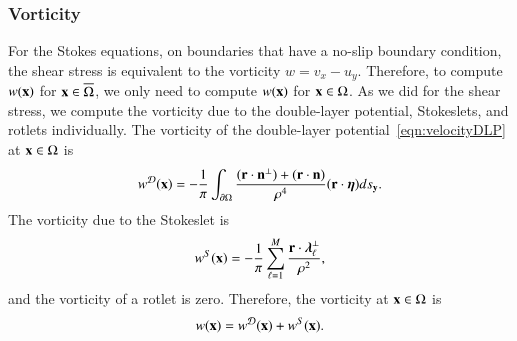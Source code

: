 \documentclass[preprint, 10pt]{elsarticle}
\begin{document}
\subsubsection{Vorticity}
For the Stokes equations, on boundaries that have a no-slip boundary
condition, the shear stress is equivalent to the vorticity $w = v_x -
u_y$.  Therefore, to compute $w({\mathbf{x}})$ for ${\mathbf{x}} \in \overline{\Omega}$,
we only need to compute $w({\mathbf{x}})$ for ${\mathbf{x}} \in \Omega$.  As we did for
the shear stress, we compute the vorticity due to the double-layer
potential, Stokeslets, and rotlets individually.  The vorticity of the
double-layer potential~\eqref{eqn:velocityDLP} at ${\mathbf{x}} \in \Omega$ is
\begin{align}
  w^{{\mathcal{D}}}({\mathbf{x}}) = -\frac{1}{\pi}\int_{{\partial}\Omega} 
    \frac{({\mathbf{r}} \cdot {\mathbf{n}}^\perp) + ({\mathbf{r}} \cdot {\mathbf{n}})}{\rho^4}
    ({\mathbf{r}} \cdot {\boldsymbol\eta}) ds_{{\mathbf{y}}}.
  \label{eqn:vorticityDLP}
\end{align}
The vorticity due to the Stokeslet is
\begin{align*}
  w^S({\mathbf{x}}) = -\frac{1}{\pi} \sum_{\ell=1}^{M} 
    \frac{{\mathbf{r}} \cdot {\boldsymbol\lambda}_\ell^\perp}{\rho^2},
\end{align*}
and the vorticity of a rotlet is zero.  Therefore, the vorticity at ${\mathbf{x}}
\in \Omega$ is
\begin{align*}
  w({\mathbf{x}}) = w^{\mathcal{D}}({\mathbf{x}}) + w^S({\mathbf{x}}).
\end{align*}


\end{document}
